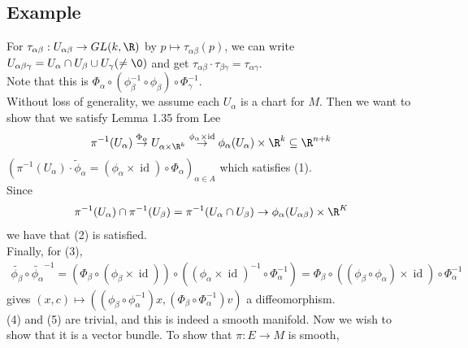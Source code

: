 \documentclass[11pt]{article}
\begin{document}
\subsection*{Example}
\label{sec:org4469cc0}
For \(\tau_{\alpha\beta}:U_{\alpha\beta}\to GL(k,\R)\) by \(p\mapsto \tau_{\alpha\beta}(p)\), we can write \(U_{\alpha\beta\gamma}=U_{\alpha}\cap U_{\beta}\cup U_{\gamma}(\neq\0)\) and get \(\tau_{\alpha\beta}\cdot\tau_{\beta\gamma}=\tau_{\alpha\gamma}\).\\
Note that this is \(\Phi_{\alpha}\circ(\phi_{\beta}^{-1}\circ\phi_{\beta})\circ\Phi_{\gamma}^{-1}\).\\
Without loss of generality, we assume each \(U_{\alpha}\) is a chart for \(M\). Then we want to show that we satisfy Lemma 1.35 from Lee\\
\begin{align*}
  \pi^{-1}(U_{\alpha})\overset{\Phi_{\alpha}}{\to}U_{\alpha\times\R^{k}}\overset{\phi_{\alpha}\times\operatorname{id}}{\to}\phi_{\alpha}(U_{\alpha})\times\R^{k}\subseteq\R^{n+k}
\end{align*}
\((\pi^{-1}(U_{\alpha})\cdot\tilde{\phi}_{\alpha}=(\phi_{\alpha}\times\operatorname{id})\circ\Phi_{\alpha})_{\alpha\in A}\) which satisfies (1).\\
Since\\
\begin{align*}
  \pi^{-1}(U_{\alpha})\cap\pi^{-1}(U_{\beta})=\pi^{-1}(U_{\alpha}\cap U_{\beta})\to\phi_{\alpha}(U_{\alpha\beta})\times\R^{K}
\end{align*}
we have that (2) is satisfied.\\
Finally, for (3),\\
\begin{align*}
  \tilde{\phi_{\beta}}\circ\tilde{\phi_{\alpha}}^{-1}
  =(\Phi_{\beta}\circ(\phi_{\beta}\times\operatorname{id}))\circ((\phi_{\alpha}\times\operatorname{id})^{-1}\circ\Phi_{\alpha}^{-1})
  =\Phi_{\beta}\circ((\phi_{\beta}\circ\phi_{\alpha})\times\operatorname{id})\circ\Phi^{-1}_{\alpha}
\end{align*}
gives \((x,c)\mapsto((\phi_{\beta}\circ\phi_{\alpha}^{-1})x,(\Phi_{\beta}\circ\Phi_{\alpha}^{-1})v)\) a diffeomorphism.\\
(4) and (5) are trivial, and this is indeed a smooth manifold. Now we wish to show that it is a vector bundle. To show that \(\pi:E\to M\) is smooth,\\

\end{document}
